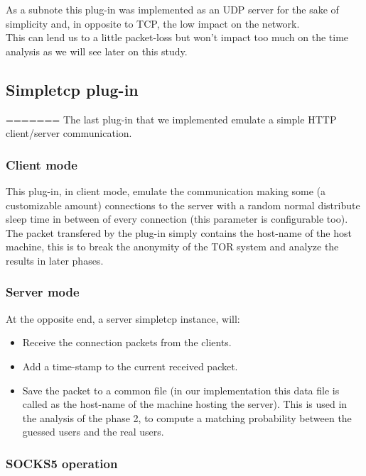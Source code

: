 As a subnote this plug-in was implemented as an UDP server for the sake of
simplicity and, in opposite to TCP, the low impact on the network.\\
This can lend us to a little packet-loss but won't impact too much on the time analysis
as we will see later on this study.

\subsection{Simpletcp plug-in}
\label{subsec:simpletcp}
=======
The last plug-in that we implemented emulate a simple HTTP client/server communication.
\subsubsection {Client mode}
This plug-in, in client mode, emulate the communication making some (a customizable amount)
connections to the server
with a random normal distribute sleep time in between of every connection
(this parameter is configurable too).\\
The packet transfered by the plug-in simply contains the host-name of the
host machine, this is to break the anonymity of the TOR system and analyze the results
in later phases.\\
\subsubsection {Server mode}
At the opposite end, a server simpletcp instance, will:
\begin{itemize}
	\item Receive the connection packets from the clients.
	\item Add a time-stamp to the current received packet.
	\item Save the packet to a common file (in our implementation this data
	file is called as the host-name of the machine hosting the server).
	This is used in the analysis of the phase 2, to compute a matching probability
	between the guessed users and the real users.
\end{itemize}


\subsubsection {SOCKS5 operation}
